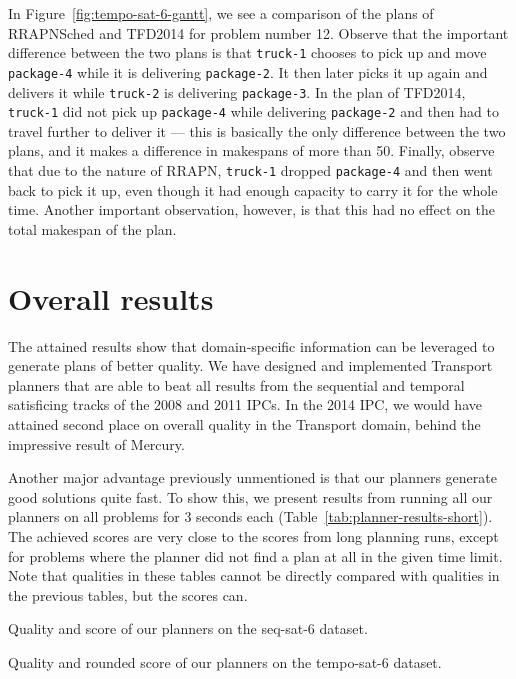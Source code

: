 {In Figure~\ref{fig:tempo-sat-6-gantt}, we see a comparison of the plans
of RRAPNSched and TFD2014 for problem number 12.
Observe that the important difference between the two plans
is that \texttt{truck-1} chooses to pick up and move \texttt{package-4}
while it is delivering \texttt{package-2}. It then later picks it up again and delivers
it while \texttt{truck-2} is delivering \texttt{package-3}.
In the plan of TFD2014, \texttt{truck-1} did not pick up \texttt{package-4}
while delivering \texttt{package-2} and then had to travel further to deliver it
--- this is basically the only difference between the two plans,
and it makes a difference in makespans of more than 50.
Finally, observe that due to the nature of RRAPN, \texttt{truck-1}
dropped \texttt{package-4} and then went back to pick it up, even though it had enough capacity
to carry it for the whole time. Another important observation, however, is that this had no effect on the total makespan
of the plan.

\section{Overall results}

The attained results show that domain-specific information can be leveraged
to generate plans of better quality.
We have designed and implemented Transport planners that are able to beat
all results from the sequential
and temporal satisficing tracks of the 2008 and 2011 IPCs.
In the 2014 IPC, we would have attained second place on overall quality in the Transport domain, behind the impressive result of Mercury.

Another major advantage previously unmentioned is that
our planners generate good solutions quite fast.
To show this, we present results from running all our planners on all problems for 3 seconds each (Table~\ref{tab:planner-results-short}).
The achieved scores are very close to the
scores from long planning runs, except for problems
where the planner did not find a plan at all in the
given time limit.
Note that qualities in these tables cannot be directly
compared with qualities in the previous tables, but the scores can.



\begin{table}[tbp]
\centering
\begin{subtable}{0.48\textwidth}
\centering
\scriptsize
\renewcommand{\footnotesize}{\scriptsize}
\setlength{\tabcolsep}{3.5pt}

\caption{Quality and score of our planners on the seq-sat-6 dataset.}
\label{tab:seq-sat-6-ipc-scores-short}
\end{subtable}
\quad
\begin{subtable}{0.48\textwidth}
\centering
\scriptsize
\renewcommand{\footnotesize}{\scriptsize}
\setlength{\tabcolsep}{2pt}

\caption{Quality and rounded score of our planners on the tempo-sat-6 dataset.}
\label{tab:tempo-sat-6-ipc-scores-short}
\end{subtable}


\end{table}}
